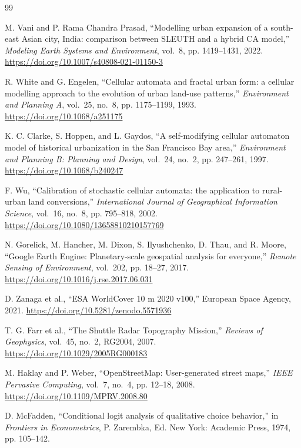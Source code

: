 \documentclass[12pt,a4paper]{article}
\begin{document}
\renewcommand{\refname}{References}
\begin{thebibliography}{99}

M. Vani and P. Rama Chandra Prasad, ``Modelling urban expansion of a south-east Asian city, India: comparison between SLEUTH and a hybrid CA model,'' \textit{Modeling Earth Systems and Environment}, vol.~8, pp. 1419--1431, 2022.
\url{https://doi.org/10.1007/s40808-021-01150-3}

R. White and G. Engelen, ``Cellular automata and fractal urban form: a cellular modelling approach to the evolution of urban land-use patterns,'' \textit{Environment and Planning A}, vol.~25, no.~8, pp. 1175--1199, 1993.
\url{https://doi.org/10.1068/a251175}

K. C. Clarke, S. Hoppen, and L. Gaydos, ``A self-modifying cellular automaton model of historical urbanization in the San Francisco Bay area,'' \textit{Environment and Planning B: Planning and Design}, vol.~24, no.~2, pp. 247--261, 1997.
\url{https://doi.org/10.1068/b240247}

F. Wu, ``Calibration of stochastic cellular automata: the application to rural-urban land conversions,'' \textit{International Journal of Geographical Information Science}, vol.~16, no.~8, pp. 795--818, 2002.
\url{https://doi.org/10.1080/13658810210157769}

N. Gorelick, M. Hancher, M. Dixon, S. Ilyushchenko, D. Thau, and R. Moore, ``Google Earth Engine: Planetary-scale geospatial analysis for everyone,'' \textit{Remote Sensing of Environment}, vol.~202, pp. 18--27, 2017.
\url{https://doi.org/10.1016/j.rse.2017.06.031}

D. Zanaga et al., ``ESA WorldCover 10 m 2020 v100,'' European Space Agency, 2021.
\url{https://doi.org/10.5281/zenodo.5571936}

T. G. Farr et al., ``The Shuttle Radar Topography Mission,'' \textit{Reviews of Geophysics}, vol.~45, no.~2, RG2004, 2007.
\url{https://doi.org/10.1029/2005RG000183}

M. Haklay and P. Weber, ``OpenStreetMap: User-generated street maps,'' \textit{IEEE Pervasive Computing}, vol.~7, no.~4, pp. 12--18, 2008.
\url{https://doi.org/10.1109/MPRV.2008.80}

D. McFadden, ``Conditional logit analysis of qualitative choice behavior,'' in \textit{Frontiers in Econometrics}, P. Zarembka, Ed. New York: Academic Press, 1974, pp. 105--142.


\end{thebibliography}
\end{document}
